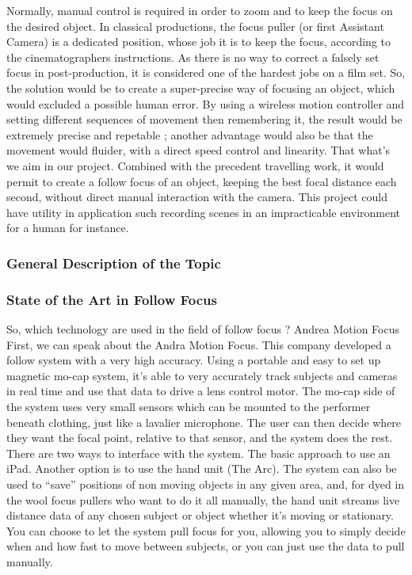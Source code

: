 \documentclass{sigchi}
\begin{document}
Normally, manual control is required in order to zoom and to keep the focus on the desired object. In classical productions, the focus puller (or first Assistant Camera) is a dedicated position, whose job it is to keep the focus, according to the cinematographers instructions. As there is no way to correct a falsely set focus in post-production, it is considered one of the hardest jobs on a film set. So, the solution would be to create a super-precise way of focusing an object, which would excluded a possible human error.
By using a wireless motion controller and setting different sequences of movement then remembering it, the result would be extremely precise and repetable ; another advantage would also be that the movement would fluider, with a direct speed control and linearity.
That what’s we aim in our project. Combined with the precedent travelling work, it would permit to create a follow focus of an object, keeping the best focal distance each second, without direct manual interaction with the camera.
This project could have utility in application such recording scenes in an impracticable environment for a human for instance.


\subsubsection{General Description of the Topic}

\subsubsection{State of the Art in Follow Focus}

So, which technology are used in the field of follow focus ?
Andrea Motion Focus
First, we can speak about the Andra Motion Focus. This company developed a follow system with a very high accuracy. Using a portable and easy to set up magnetic mo-cap system, it’s able to very accurately track subjects and cameras in real time and use that data to drive a lens control motor.  The mo-cap side of the system uses very small sensors which can be mounted to the performer beneath clothing, just like a lavalier microphone. The user can then decide where they want the focal point, relative to that sensor, and the system does the rest. 
There are two ways to interface with the system. The basic approach to use an iPad. Another option is to use the hand unit (The Arc).
The system can also be used to “save” positions of non moving objects in any given area, and, for dyed in the wool focus pullers who want to do it all manually, the hand unit streams live distance data of any chosen subject or object whether it’s moving or stationary.  You can choose to let the system pull focus for you, allowing you to simply decide when and how fast to move between subjects, or you can just use the data to pull manually.
\end{document}
